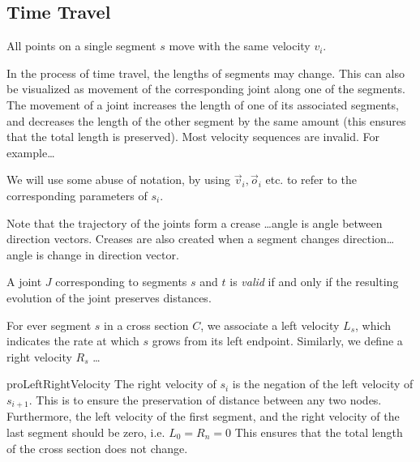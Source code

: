 \subsection{Time Travel}
\label{sec:time_travel}

\begin{lemma}
\label{lem:uniform_velocity}
All points on a single segment $s$ move with the same velocity $v_i$.
\end{lemma}

In the process of time travel, the lengths of segments may change.
This can also be visualized as movement of the corresponding joint along one of the segments.
The movement of a joint increases the length of one of its associated segments,
and decreases the length of the other segment by the same amount (this ensures that the total length is preserved).
Most velocity sequences are invalid. For example\ldots

We will use some abuse of notation, by using $\vec v_i, \vec o_i$ etc.
to refer to the corresponding parameters of $s_i$.

Note that the trajectory of the joints form a crease \ldots angle is angle between direction vectors.
Creases are also created when a segment changes direction\ldots angle is change in direction vector.

\begin{proposition}
\label{prop:valid_joint}
A joint $J$ corresponding to segments $s$ and $t$ is \emph{valid}
if and only if the resulting evolution of the joint preserves distances.
\end{proposition}

\begin{definition}
\label{def:segment_length}
For ever segment $s$ in a cross section $C$, we associate a left velocity $L_s$,
which indicates the rate at which $s$ grows from its left endpoint.
Similarly, we define a right velocity $R_s$ \ldots
\end{definition}

\begin{restatable}{pro}{LeftRightVelocity}
\label{pro:left_right_velocity}
The right velocity of $s_{i}$ is the negation of the left velocity of $s_{i+1}$.
This is to ensure the preservation of distance between any two nodes.
Furthermore, the left velocity of the first segment, and the right velocity of the last segment should be zero, i.e. $L_0 = R_n = 0$
This ensures that the total length of the cross section does not change.
\end{restatable}

